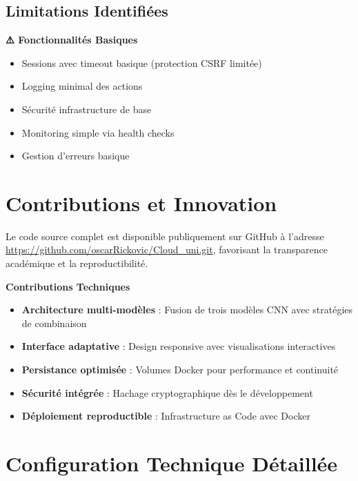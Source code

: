 \documentclass[12pt,a4paper]{article}
\begin{document}
\subsection{Limitations Identifiées}

\begin{partialbox}
\textbf{⚠️ Fonctionnalités Basiques}
\begin{itemize}
  \item Sessions avec timeout basique (protection CSRF limitée)
  \item Logging minimal des actions
  \item Sécurité infrastructure de base
  \item Monitoring simple via health checks
  \item Gestion d'erreurs basique
\end{itemize}
\end{partialbox}


\section{Contributions et Innovation}

\begin{implementedbox}
Le code source complet est disponible publiquement sur GitHub à l'adresse \url{https://github.com/oscarRickovic/Cloud_uni.git}, favorisant la transparence académique et la reproductibilité.

\textbf{Contributions Techniques}
\begin{itemize}
  \item \textbf{Architecture multi-modèles} : Fusion de trois modèles CNN avec stratégies de combinaison
  \item \textbf{Interface adaptative} : Design responsive avec visualisations interactives
  \item \textbf{Persistance optimisée} : Volumes Docker pour performance et continuité
  \item \textbf{Sécurité intégrée} : Hachage cryptographique dès le développement
  \item \textbf{Déploiement reproductible} : Infrastructure as Code avec Docker
\end{itemize}
\end{implementedbox}

\section{Configuration Technique Détaillée}
\end{document}
